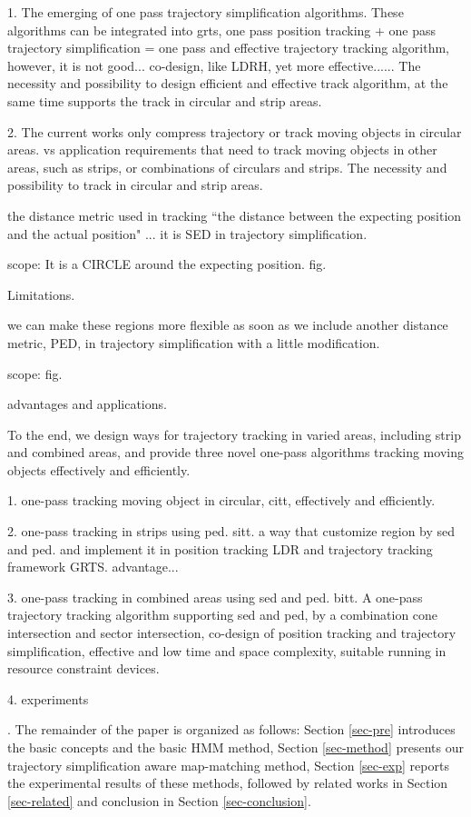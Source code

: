 
1. The emerging of one pass trajectory simplification algorithms. These algorithms can be integrated into grts, one pass position tracking + one pass trajectory simplification = one pass and effective trajectory tracking algorithm, however, it is not good... co-design, like LDRH, yet more effective...... 
The necessity and possibility to design efficient and effective track algorithm, at the same time supports the track in circular and strip areas.

2. The current works only compress trajectory or track moving objects in circular areas. vs application requirements that need to track moving objects in other areas, such as strips, or combinations of circulars and strips.
The necessity and possibility to track in circular and strip areas.

the distance metric used in tracking ``the distance between the expecting position and the actual position" ... it is SED in trajectory simplification. 

scope: It is  a CIRCLE around the expecting position. fig.

Limitations.

we can make these regions more flexible as soon as we include another distance metric, PED, in trajectory simplification with a little modification.

scope: fig.

advantages and applications.



To the end, we design ways for trajectory tracking in varied areas, including strip and combined areas, and provide three novel one-pass algorithms tracking moving objects effectively and efficiently. 

1. one-pass tracking moving object in circular, citt, effectively and efficiently.

2. one-pass tracking in strips using ped. sitt.
a way that customize region by sed and ped. and implement it in position tracking LDR and trajectory tracking framework GRTS. advantage...

3. one-pass tracking in combined areas using sed and ped. bitt.  
A one-pass trajectory tracking algorithm supporting sed and ped, by a combination cone intersection and sector intersection, \ie co-design of position tracking and trajectory simplification, effective and low time and space complexity, suitable running in resource constraint devices.

4. experiments

.
The remainder of the paper is organized as follows:
Section \ref{sec-pre} introduces the basic concepts and the basic HMM method,
Section \ref{sec-method} presents our trajectory simplification aware map-matching method,
Section \ref{sec-exp} reports the experimental results of these methods, followed by related works in Section \ref{sec-related} and conclusion in Section \ref{sec-conclusion}.



